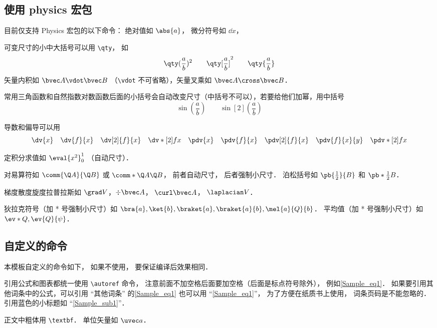 \subsection{使用 physics 宏包}
目前仅支持 Physics 宏包的以下命令： 绝对值如 $\abs{a}$， 微分符号如 $\dd{x}$，

可变尺寸的小中大括号可以用 \verb|\qty|， 如
\begin{equation}
\qty(\frac ab)^2 \qquad \qty[\frac ab]^2 \qquad \qty{ \frac ab}
\end{equation}
矢量内积如 $\bvec A \vdot \bvec B$ （\verb|\vdot| 不可省略），矢量叉乘如 $\bvec A\cross\bvec B$．

常用三角函数和自然指数对数函数后面的小括号会自动改变尺寸（中括号不可以），若要给他们加幂，用中括号
\begin{equation}
\sin(\frac ab) \qquad \sin[2](\frac ab)
\end{equation}

导数和偏导可以用
\begin{equation}
\dv{x} \quad \dv{f}{x} \quad \dv[2]{f}{x} \quad \dv*[2]{f}{x} \quad
\pdv{x} \quad \pdv{f}{x} \quad \pdv[2]{f}{x} \quad \pdv{f}{x}{y} \quad \pdv*[2]{f}{x}
\end{equation}

定积分求值如 $\eval{x^2}_0^1$ （自动尺寸）．

对易算符如 $\comm{\Q A}{\Q B}$ 或 $\comm*{\Q A}{\Q B}$， 前者自动尺寸， 后者强制小尺寸． 泊松括号如 $\pb{\frac12}{B}$ 和 $\pb*{\frac12}{B}$．

梯度散度旋度拉普拉斯如 $\grad V$，$\div\bvec A$， $\curl\bvec A$， $\laplacian V$．

狄拉克符号（加 * 号强制小尺寸）如 $\bra{a}, \ket{b}, \braket{a}, \braket{a}{b}, \mel{a}{Q}{b}$． 平均值（加 * 号强制小尺寸）如 $\ev*{Q}, \ev{Q}{\psi}$．

\subsection{自定义的命令}\label{Sample_sub1}
本模板自定义的命令如下， 如果不使用， 要保证编译后效果相同．

引用公式和图表都统一使用 \verb|\autoref| 命令， 注意前面不加空格后面要加空格（后面是标点符号除外）， 例如\autoref{Sample_eq1}． 如果要引用其他词条中的公式，可以引用 “其他词条” 的\autoref{Sample_eq1} 也可以用 “\autoref{Sample_eq1}”， 为了方便在纸质书上使用， 词条页码是不能忽略的． 引用蓝色的小标题如 “\autoref{Sample_sub1}”．

正文中粗体用 \verb|\textbf|． 单位矢量如 $\uvec a$．

